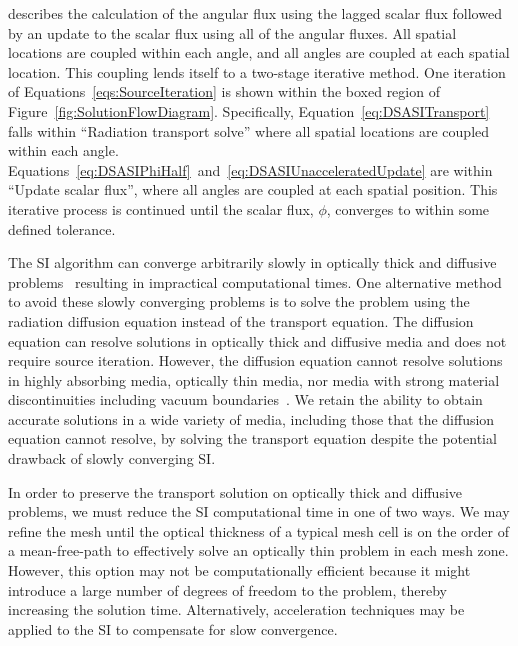 \documentclass[12pt,letterpaper]{article}
\begin{document}
\noindent describes the calculation of the angular flux using the lagged scalar flux followed by an update to the scalar flux using all of the angular fluxes. All spatial locations are coupled within each angle, and all angles are coupled at each spatial location. This coupling lends itself to a two-stage iterative method. One iteration of Equations~\ref{eqs:SourceIteration} is shown within the boxed region of Figure~\ref{fig:SolutionFlowDiagram}. Specifically, Equation~\ref{eq:DSASITransport} falls within ``Radiation transport solve'' where all spatial locations are coupled within each angle. Equations~\ref{eq:DSASIPhiHalf}~and~\ref{eq:DSASIUnacceleratedUpdate} are within ``Update scalar flux'', where all angles are coupled at each spatial position. This iterative process is continued until the scalar flux, $\phi$, converges to within some defined tolerance.

The SI algorithm can converge arbitrarily slowly in optically thick and diffusive problems~\cite{LarsenStableDSATheory} resulting in impractical computational times. One alternative method to avoid these slowly converging problems is to solve the problem using the radiation diffusion equation instead of the transport equation. The diffusion equation can resolve solutions in optically thick and diffusive media and does not require source iteration. However, the diffusion equation cannot resolve solutions in highly absorbing media, optically thin media, nor media with strong material discontinuities including vacuum boundaries~\cite{D&H}. We retain the ability to obtain accurate solutions in a wide variety of media, including those that the diffusion equation cannot resolve, by solving the transport equation despite the potential drawback of slowly converging SI.

In order to preserve the transport solution on optically thick and diffusive problems, we must reduce the SI computational time in one of two ways. We may refine the mesh until the optical thickness of a typical mesh cell is on the order of a mean-free-path to effectively solve an optically thin problem in each mesh zone. However, this option may not be computationally efficient because it might introduce a large number of degrees of freedom to the problem, thereby increasing the solution time. Alternatively, acceleration techniques may be applied to the SI to compensate for slow convergence.
\end{document}
